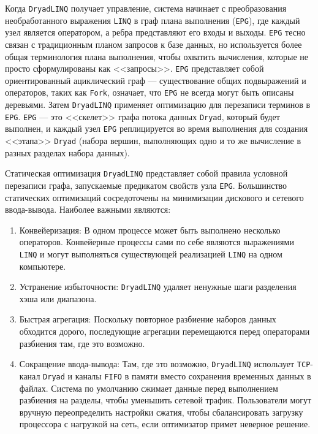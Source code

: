 Когда \texttt{DryadLINQ} получает управление, система начинает с преобразования необработанного выражения \texttt{LINQ} в граф плана выполнения (\texttt{EPG}), где каждый узел является оператором, а ребра представляют его входы и выходы. 
\texttt{EPG} тесно связан с традиционным планом запросов к базе данных, но используется более общая терминология плана выполнения, чтобы охватить вычисления, которые не просто сформулированы как <<запросы>>. 
\texttt{EPG} представляет собой ориентированный ациклический граф --- существование общих подвыражений и операторов, таких как \texttt{Fork}, означает, что \texttt{EPG} не всегда могут быть описаны деревьями. 
Затем \texttt{DryadLINQ} применяет оптимизацию для перезаписи терминов в \texttt{EPG}. 
\texttt{EPG} --- это <<скелет>> графа потока данных \texttt{Dryad}, который будет выполнен, и каждый узел \texttt{EPG} реплицируется во время выполнения для создания <<этапа>> \texttt{Dryad} (набора вершин, выполняющих одно и то же вычисление в разных разделах набора данных).

Статическая оптимизация \texttt{DryadLINQ} представляет собой правила условной перезаписи графа, запускаемые предикатом свойств узла \texttt{EPG}. 
Большинство статических оптимизаций сосредоточены на минимизации дискового и сетевого ввода-вывода. 
Наиболее важными являются:

\begin{enumerate}
  \item Конвейеризация: В одном процессе может быть выполнено несколько операторов. 
    Конвейерные процессы сами по себе являются выражениями \texttt{LINQ} и могут выполняться существующей реализацией \texttt{LINQ} на одном компьютере. 
  \item Устранение избыточности: \texttt{DryadLINQ} удаляет ненужные шаги разделения хэша или диапазона. 
  \item Быстрая агрегация: Поскольку повторное разбиение наборов данных обходится дорого, последующие агрегации перемещаются перед операторами разбиения там, где это возможно.
  \item Сокращение ввода-вывода: Там, где это возможно, \texttt{DryadLINQ} использует \texttt{TCP}-канал \texttt{Dryad} и каналы \texttt{FIFO} в памяти вместо сохранения временных данных в файлах. 
    Система по умолчанию сжимает данные перед выполнением разбиения на разделы, чтобы уменьшить сетевой трафик. 
    Пользователи могут вручную переопределить настройки сжатия, чтобы сбалансировать загрузку процессора с нагрузкой на сеть, если оптимизатор примет неверное решение.
\end{enumerate}

